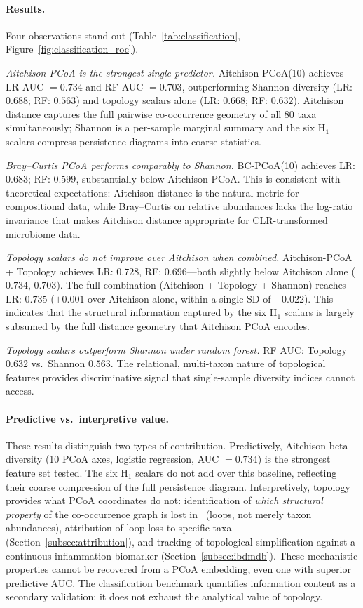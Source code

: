\paragraph{Results.}
Four observations stand out (Table~\ref{tab:classification},
Figure~\ref{fig:classification_roc}).

\textit{Aitchison-PCoA is the strongest single predictor.}
Aitchison-PCoA(10) achieves LR AUC $= 0.734$ and RF AUC $= 0.703$,
outperforming Shannon diversity (LR: $0.688$; RF: $0.563$) and topology
scalars alone (LR: $0.668$; RF: $0.632$).
Aitchison distance captures the full pairwise co-occurrence geometry of all
80 taxa simultaneously; Shannon is a per-sample marginal summary and the six
H$_1$ scalars compress persistence diagrams into coarse statistics.

\textit{Bray--Curtis PCoA performs comparably to Shannon.}
BC-PCoA(10) achieves LR: $0.683$; RF: $0.599$, substantially below
Aitchison-PCoA.
This is consistent with theoretical expectations: Aitchison distance is
the natural metric for compositional data, while Bray--Curtis on relative
abundances lacks the log-ratio invariance that makes Aitchison distance
appropriate for CLR-transformed microbiome data.

\textit{Topology scalars do not improve over Aitchison when combined.}
Aitchison-PCoA + Topology achieves LR: $0.728$, RF: $0.696$---both slightly
below Aitchison alone ($0.734$, $0.703$).
The full combination (Aitchison + Topology + Shannon) reaches LR: $0.735$
($+0.001$ over Aitchison alone, within a single SD of $\pm 0.022$).
This indicates that the structural information captured by the six H$_1$
scalars is largely subsumed by the full distance geometry that Aitchison PCoA
encodes.

\textit{Topology scalars outperform Shannon under random forest.}
RF AUC: Topology $0.632$ vs.\ Shannon $0.563$.
The relational, multi-taxon nature of topological features provides
discriminative signal that single-sample diversity indices cannot access.

\paragraph{Predictive vs.\ interpretive value.}
These results distinguish two types of contribution.
Predictively, Aitchison beta-diversity (10 PCoA axes, logistic regression,
AUC $= 0.734$) is the strongest feature set tested.
The six H$_1$ scalars do not add over this baseline, reflecting their coarse
compression of the full persistence diagram.
Interpretively, topology provides what PCoA coordinates do not: identification
of \emph{which structural property} of the co-occurrence graph is lost in
\ibd\ (loops, not merely taxon abundances), attribution of loop loss to
specific taxa (Section~\ref{subsec:attribution}), and tracking of topological
simplification against a continuous inflammation biomarker
(Section~\ref{subsec:ibdmdb}).
These mechanistic properties cannot be recovered from a PCoA embedding, even
one with superior predictive AUC.
The classification benchmark quantifies information content as a secondary
validation; it does not exhaust the analytical value of topology.

